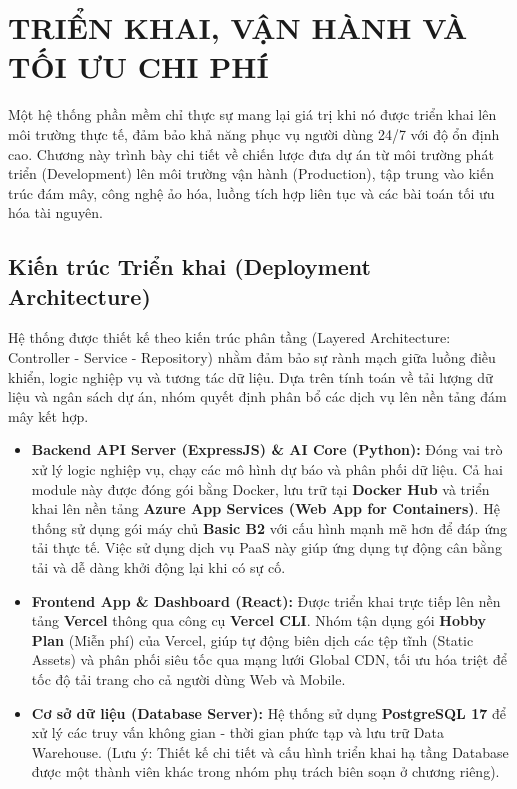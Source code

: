 \section{TRIỂN KHAI, VẬN HÀNH VÀ TỐI ƯU CHI PHÍ}

Một hệ thống phần mềm chỉ thực sự mang lại giá trị khi nó được triển khai lên môi trường thực tế, đảm bảo khả năng phục vụ người dùng 24/7 với độ ổn định cao. Chương này trình bày chi tiết về chiến lược đưa dự án từ môi trường phát triển (Development) lên môi trường vận hành (Production), tập trung vào kiến trúc đám mây, công nghệ ảo hóa, luồng tích hợp liên tục và các bài toán tối ưu hóa tài nguyên.

\subsection{Kiến trúc Triển khai (Deployment Architecture)}

Hệ thống được thiết kế theo kiến trúc phân tầng (Layered Architecture: Controller - Service - Repository) nhằm đảm bảo sự rành mạch giữa luồng điều khiển, logic nghiệp vụ và tương tác dữ liệu. Dựa trên tính toán về tải lượng dữ liệu và ngân sách dự án, nhóm quyết định phân bổ các dịch vụ lên nền tảng đám mây kết hợp.

\begin{itemize}
    \item \textbf{Backend API Server (ExpressJS) \& AI Core (Python):} Đóng vai trò xử lý logic nghiệp vụ, chạy các mô hình dự báo và phân phối dữ liệu. Cả hai module này được đóng gói bằng Docker, lưu trữ tại \textbf{Docker Hub} và triển khai lên nền tảng \textbf{Azure App Services (Web App for Containers)}. Hệ thống sử dụng gói máy chủ \textbf{Basic B2} với cấu hình mạnh mẽ hơn để đáp ứng tải thực tế. Việc sử dụng dịch vụ PaaS này giúp ứng dụng tự động cân bằng tải và dễ dàng khởi động lại khi có sự cố.
    \item \textbf{Frontend App \& Dashboard (React):} Được triển khai trực tiếp lên nền tảng \textbf{Vercel} thông qua công cụ \textbf{Vercel CLI}. Nhóm tận dụng gói \textbf{Hobby Plan} (Miễn phí) của Vercel, giúp tự động biên dịch các tệp tĩnh (Static Assets) và phân phối siêu tốc qua mạng lưới Global CDN, tối ưu hóa triệt để tốc độ tải trang cho cả người dùng Web và Mobile.
    \item \textbf{Cơ sở dữ liệu (Database Server):} Hệ thống sử dụng \textbf{PostgreSQL 17} để xử lý các truy vấn không gian - thời gian phức tạp và lưu trữ Data Warehouse. (Lưu ý: Thiết kế chi tiết và cấu hình triển khai hạ tầng Database được một thành viên khác trong nhóm phụ trách biên soạn ở chương riêng).
\end{itemize}

